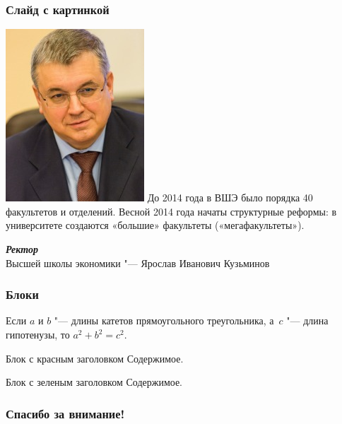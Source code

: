 \documentclass{beamer}
\begin{document}
\begin{frame}
\frametitle{Слайд с картинкой}
	\begin{multicols}{2}
		\includegraphics[width=\columnwidth]{kouzminov.png}
		\columnbreak
		До 2014 года в ВШЭ было порядка 40 факультетов и отделений. Весной 2014 года начаты структурные реформы: в университете создаются «большие» факультеты («мегафакультеты»).
		\medskip 

		\textbf{\textit{Ректор}} \\ Высшей школы экономики "--- \alert{Ярослав Иванович Кузьминов}
	\end{multicols}
\end{frame}

\begin{frame}
\frametitle{Блоки}
	\begin{theorem}[Пифагора]
		Если $a$ и $b$ "--- длины катетов прямоугольного треугольника, а~$c$ "--- длина гипотенузы, то $a^2+b^2=c^2$.
	\end{theorem}

	\begin{alertblock}{Блок с красным заголовком}
		Содержимое.
	\end{alertblock}

	\begin{exampleblock}{Блок с зеленым заголовком}
		Содержимое.
	\end{exampleblock}
\end{frame}

\begin{frame}[c]
\begin{center}
\frametitle{\LARGE Спасибо за внимание!}

{\LARGE \inserttitle}

\bigskip

{\insertauthor} 

\bigskip\bigskip

{\insertinstitute}

\bigskip\bigskip

{\large \insertdate}
\end{center}
\end{frame}
\end{document}
